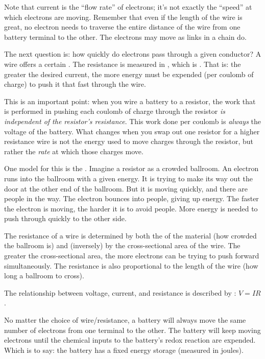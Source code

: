 \documentclass[11pt, oneside]{amsart}
\begin{document}
Note that current is the ``flow rate'' of electrons; it's not exactly
the ``speed'' at which electrons are moving. Remember that even if the
length of the wire is great, no electron needs to traverse the entire
distance of the wire from one battery terminal to the other. The
electrons may move as links in a chain do.

The next question is: how quickly do electrons pass through a given
conductor? A wire offers a certain . The resistance
is measured in , which is . That is: the greater the desired current, the more energy must
be expended (per coulomb of charge) to push it that fast through the
wire.

This is an important point: when you wire a battery to a resistor, the
work that is performed in pushing each coulomb of charge through the
resistor \emph{is independent of the resistor's resistance}. This work
done per coulomb is \emph{always} the voltage of the battery. What
changes when you swap out one resistor for a higher resistance wire is
not the energy used to move charges through the resistor, but rather the
\emph{rate} at which those charges move.

One model for this is the . Imagine a resistor as a
crowded ballroom. An electron runs into the ballroom with a given
energy. It is trying to make its way out the door at the other end of
the ballroom. But it is moving quickly, and there are people in the way.
The electron bounces into people, giving up energy. The faster the
electron is moving, the harder it is to avoid people. More energy is
needed to push through quickly to the other side.


The resistance of a wire is determined by both the 
of the material (how crowded the ballroom is) and (inversely) by the
cross-sectional area of the wire. The greater the cross-sectional area,
the more electrons can be trying to push forward simultaneously. The
resistance is also proportional to the length of the wire (how long a
ballroom to cross).

The relationship between voltage, current, and resistance is described
by : $V=IR$.

No matter the choice of wire/resistance, a battery will always move the
same number of electrons from one terminal to the other. The battery
will keep moving electrons until the chemical inputs to the battery's
redox reaction are expended. Which is to say: the battery has a fixed
energy storage (measured in joules).
\end{document}
